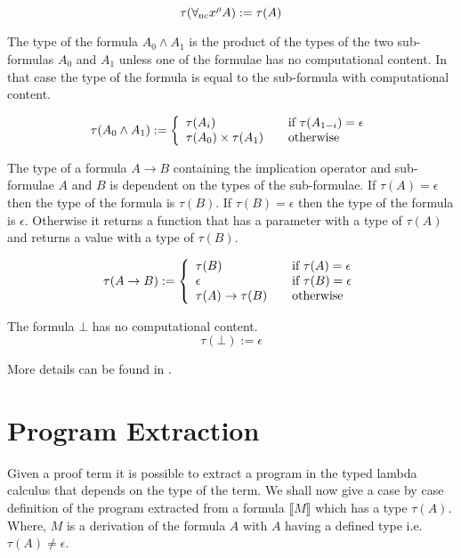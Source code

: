 \[
\tau(\forall_{\mathrm{nc}} x^{\rho} A) := \tau(A)
\]

The type of the formula $A_0 \wedge A_1$ is the product of the types of the two sub-formulas $A_0$ and $A_1$ unless one of the formulae has no computational content. In that case the type of the formula is equal to the sub-formula with computational content.

\[
\tau(A_0 \wedge A_1) := \left\{ 
\begin{array}{l l}
  \tau(A_i) & \quad \text{if $\tau(A_{1-i}) = \epsilon$}\\
 \tau(A_0) \times \tau(A_1) & \quad \text{otherwise}\\
\end{array} \right.
\]

The type of a formula $A \to B$ containing the implication operator and
sub-formulae $A$ and $B$ is dependent on the types of the sub-formulae.
If $\tau (A) = \epsilon$ then the type of the formula is $ \tau (B)$. If $\tau
(B) = \epsilon$ then the type of the formula is $\epsilon$. Otherwise it
returns a function that has a parameter with a type of $\tau (A)$ and returns a value with
a type of $\tau (B)$.

\[
\tau(A \to B) := \left\{ 
\begin{array}{l l}
  \tau (B) & \quad \text{if $\tau (A) = \epsilon$}\\
  \epsilon & \quad \text{if $\tau (B) = \epsilon$}\\
  \tau (A) \to \tau (B) & \quad \text{otherwise}\\
\end{array} \right.
\]

The formula $\bot$ has no computational content.
\[
\tau(\bot) := \epsilon
\]

More details can be found in \cite{HS14}.

\section{Program Extraction}
\label{sec:programextraction}
Given a proof term it is possible to extract a program in the typed lambda calculus  that depends on the type of the term. We shall now give a case by case definition of the program extracted from a formula $\llbracket M \rrbracket$ which has a type $\tau (A)$. Where, $M$ is a derivation of the formula $A$ with $A$ having a defined type i.e. $ \tau (A) \neq \epsilon $.

